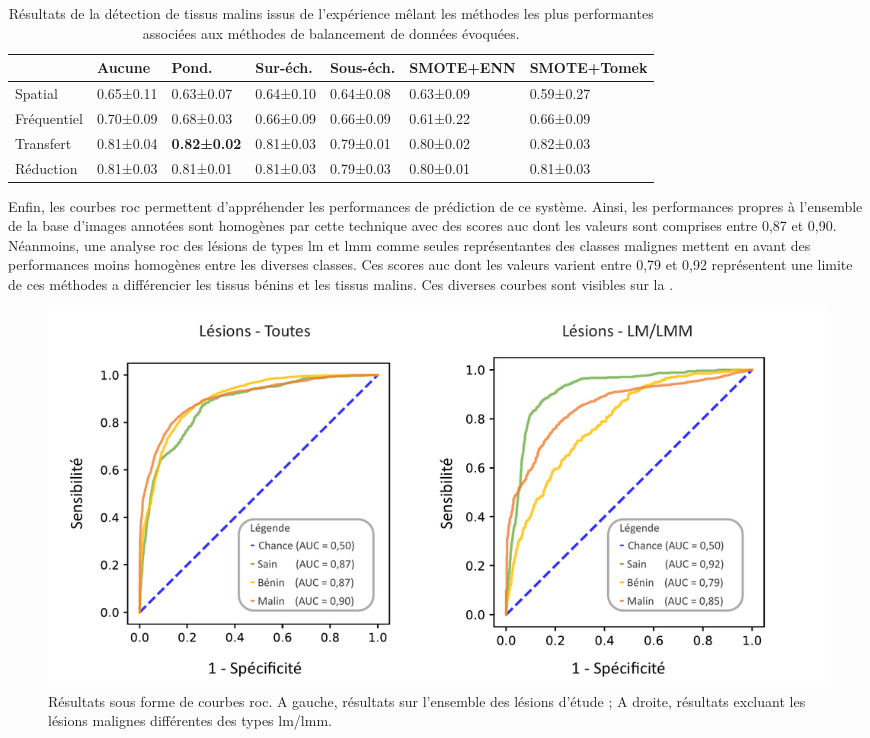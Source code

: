 \begin{table}[H]
    \begin{tabular}{lllllll}
        \toprule
                    & Aucune    & Pond.             & Sur-éch.  & Sous-éch. & SMOTE+ENN & SMOTE+Tomek\\ \hline
        Spatial     & 0.65±0.11 & 0.63±0.07         & 0.64±0.10 & 0.64±0.08 & 0.63±0.09 & 0.59±0.27  \\
        Fréquentiel & 0.70±0.09 & 0.68±0.03         & 0.66±0.09 & 0.66±0.09 & 0.61±0.22 & 0.66±0.09  \\ \rowcolor[HTML]{E7E6E6} 
        Transfert   & 0.81±0.04 & \textbf{0.82±0.02}& 0.81±0.03 & 0.79±0.01 & 0.80±0.02 & 0.82±0.03  \\
        Réduction   & 0.81±0.03 & 0.81±0.01         & 0.81±0.03 & 0.79±0.03 & 0.80±0.01 & 0.81±0.03  \\ \bottomrule 
    \end{tabular}
    \caption{Résultats de la détection de tissus malins issus de l'expérience mêlant les méthodes les plus performantes associées aux méthodes de balancement de données évoquées.}
    \label{tab:results_balancement_malignant}
\end{table}\par

Enfin, les courbes \gls{roc} permettent d'appréhender les performances de prédiction de ce système. Ainsi, les performances propres à l'ensemble de la base d'images annotées sont homogènes par cette technique avec des scores \gls{auc} dont les valeurs sont comprises entre 0,87 et 0,90. Néanmoins, une analyse \gls{roc} des lésions de types \gls{lm} et \gls{lmm} comme seules représentantes des classes malignes mettent en avant des performances moins homogènes entre les diverses classes. Ces scores \gls{auc} dont les valeurs varient entre 0,79 et 0,92 représentent une limite de ces méthodes a différencier les tissus bénins et les tissus malins. Ces diverses courbes sont visibles sur la .\par

\begin{figure}[H]
    \centering
    \includegraphics[width=\textwidth]{contents/chapter_4/resources/results_image_classification_roc.pdf}
    \caption{Résultats sous forme de courbes \gls{roc}. A gauche, résultats sur l'ensemble des lésions d'étude ; A droite, résultats excluant les lésions malignes différentes des types \gls{lm}/\gls{lmm}.}
    \label{fig:results_image_classification_roc}
\end{figure}\par

